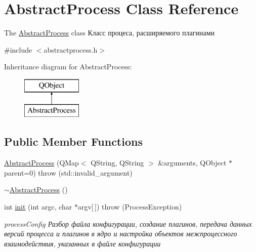 \hypertarget{class_abstract_process}{}\section{Abstract\+Process Class Reference}
\label{class_abstract_process}


The \hyperlink{class_abstract_process}{Abstract\+Process} class  Класс процеса, расширяемого плагинами  




{\ttfamily \#include $<$abstractprocess.\+h$>$}

Inheritance diagram for Abstract\+Process\+:\begin{figure}[H]
\begin{center}
\leavevmode
\includegraphics[height=2.000000cm]{class_abstract_process}
\end{center}
\end{figure}
\subsection*{Public Member Functions}
\begin{DoxyCompactItemize}
\item 
\hyperlink{class_abstract_process_a6e39ac735166365e2a844aff7c0bc6e4}{Abstract\+Process} (Q\+Map$<$ Q\+String, Q\+String $>$ \&arguments, Q\+Object $\ast$parent=0)  throw (std\+::invalid\+\_\+argument)
\item 
\hyperlink{class_abstract_process_a585a0cfa21de4b8dc84612424f83afd4}{$\sim$\+Abstract\+Process} ()
\item 
int \hyperlink{class_abstract_process_ad567aa24b1ea6121a29a01b14f5bcf86}{init} (int argc, char $\ast$argv\mbox{[}$\,$\mbox{]})  throw (\+Process\+Exception)
\begin{DoxyCompactList}\small\item\em process\+Config  Разбор файла конфигурации, создание плагинов, передача данных версий процесса и плагинов в ядро и настройка объектов межпроцессного взаимодействия, указанных в файле конфигурации \end{DoxyCompactList}\end{DoxyCompactItemize}
